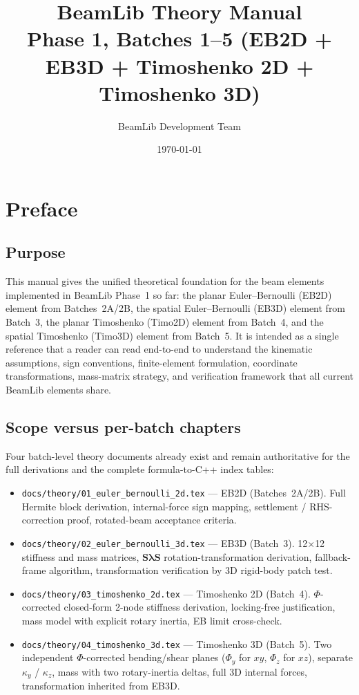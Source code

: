 \documentclass[11pt,a4paper]{book}
\title{BeamLib Theory Manual\\
\large Phase 1, Batches 1--5 (EB2D + EB3D + Timoshenko 2D + Timoshenko 3D)}
\author{BeamLib Development Team}
\date{\today}
\newcommand{\bmath}[1]{\boldsymbol{#1}}
\newcommand{\Sdiag}{\bmath{S}}
\newcommand{\lam}{\bmath{\lambda}}
\begin{document}
\frontmatter
\maketitle
\tableofcontents

\chapter{Preface}

\section*{Purpose}

This manual gives the unified theoretical foundation for the beam elements implemented in BeamLib Phase~1 so far: the planar Euler--Bernoulli (EB2D) element from Batches~2A/2B, the spatial Euler--Bernoulli (EB3D) element from Batch~3, the planar Timoshenko (Timo2D) element from Batch~4, and the spatial Timoshenko (Timo3D) element from Batch~5. It is intended as a single reference that a reader can read end-to-end to understand the kinematic assumptions, sign conventions, finite-element formulation, coordinate transformations, mass-matrix strategy, and verification framework that all current BeamLib elements share.

\section*{Scope versus per-batch chapters}

Four batch-level theory documents already exist and remain authoritative for the full derivations and the complete formula-to-C++ index tables:

\begin{itemize}
    \item \texttt{docs/theory/01\_euler\_bernoulli\_2d.tex} --- EB2D (Batches~2A/2B). Full Hermite block derivation, internal-force sign mapping, settlement / RHS-correction proof, rotated-beam acceptance criteria.
    \item \texttt{docs/theory/02\_euler\_bernoulli\_3d.tex} --- EB3D (Batch~3). 12$\times$12 stiffness and mass matrices, $\Sdiag\lam\Sdiag$ rotation-transformation derivation, fallback-frame algorithm, transformation verification by 3D rigid-body patch test.
    \item \texttt{docs/theory/03\_timoshenko\_2d.tex} --- Timoshenko 2D (Batch~4). $\Phi$-corrected closed-form 2-node stiffness derivation, locking-free justification, mass model with explicit rotary inertia, EB limit cross-check.
    \item \texttt{docs/theory/04\_timoshenko\_3d.tex} --- Timoshenko 3D (Batch~5). Two independent $\Phi$-corrected bending/shear planes ($\Phi_y$ for $xy$, $\Phi_z$ for $xz$), separate $\kappa_y$ / $\kappa_z$, mass with two rotary-inertia deltas, full 3D internal forces, transformation inherited from EB3D.
\end{itemize}
\end{document}
